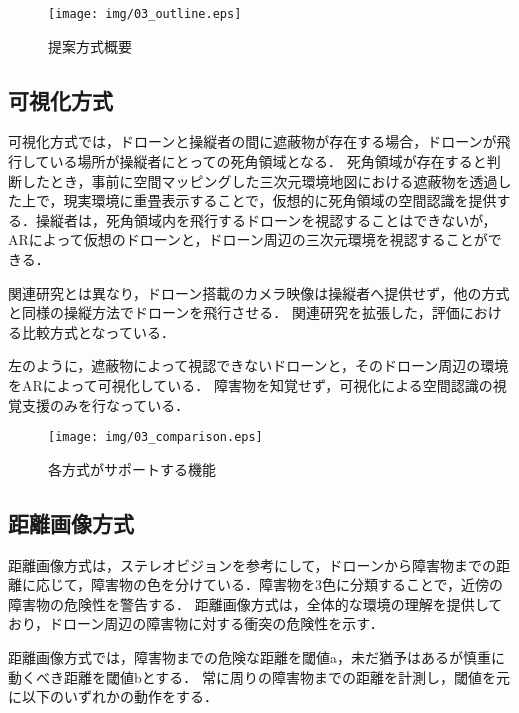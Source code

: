 \documentclass[submit, sigrecommended]{ipsj}
\begin{document}
\begin{figure}[b]
\centering
\texttt{[image: img/03\_outline.eps]}
\caption{提案方式概要}
\label{fig:03_outline}
\end{figure}


\subsection{可視化方式}
可視化方式では，ドローンと操縦者の間に遮蔽物が存在する場合，ドローンが飛行している場所が操縦者にとっての死角領域となる．
死角領域が存在すると判断したとき，事前に空間マッピングした三次元環境地図における遮蔽物を透過した上で，現実環境に重畳表示することで，仮想的に死角領域の空間認識を提供する．操縦者は，死角領域内を飛行するドローンを視認することはできないが，ARによって仮想のドローンと，ドローン周辺の三次元環境を視認することができる．
\par
関連研究\cite{article-ar05}とは異なり，ドローン搭載のカメラ映像は操縦者へ提供せず，他の方式と同様の操縦方法でドローンを飛行させる．
関連研究を拡張した，評価における比較方式となっている．
\par
{}左のように，遮蔽物によって視認できないドローンと，そのドローン周辺の環境をARによって可視化している．
障害物を知覚せず，可視化による空間認識の視覚支援のみを行なっている．

  
\begin{figure*}[!tb]
  \centering
  \texttt{[image: img/03\_comparison.eps]}
  \caption{各方式がサポートする機能}
  \label{fig:03_comparison}
\end{figure*}



\subsection{距離画像方式}
距離画像方式は，ステレオビジョンを参考にして，ドローンから障害物までの距離に応じて，障害物の色を分けている．障害物を3色に分類することで，近傍の障害物の危険性を警告する．
距離画像方式は，全体的な環境の理解を提供しており，ドローン周辺の障害物に対する衝突の危険性を示す．
\par
距離画像方式では，障害物までの危険な距離を閾値a，未だ猶予はあるが慎重に動くべき距離を閾値bとする．
常に周りの障害物までの距離を計測し，閾値を元に以下のいずれかの動作をする．
\end{document}
